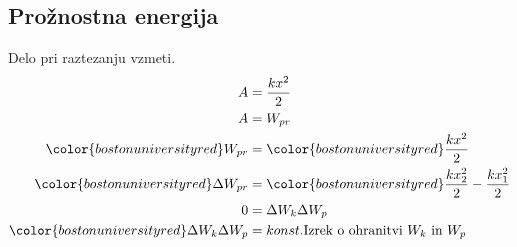 {\color{indiagreen}\subsection{Prožnostna energija}}
Delo pri raztezanju vzmeti.\\
\begin{align*}
	A &= \frac{kx^2}{2}\\
	A &= W_{pr}\\
	{\color{bostonuniversityred}W_{pr}} &= {\color{bostonuniversityred}\frac{kx^2}{2}}\\
	{\color{bostonuniversityred}\Delta W_{pr}} &= {\color{bostonuniversityred}\frac{kx_2^2}{2} - \frac{kx_1^2}{2}}\\
	0 &= \Delta W_k \Delta W_p\\
	{\color{bostonuniversityred}\Delta W_k \Delta W_p} &= konst. \text{Izrek o ohranitvi $W_k$ in $W_p$}\\
\end{align*} 
